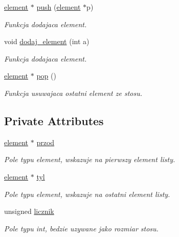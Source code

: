 \begin{DoxyCompactItemize}
\hyperlink{classelement}{element} $\ast$ \hyperlink{classstos__lista_ad38186a811405f247940c262073744f1}{push} (\hyperlink{classelement}{element} $\ast$p)
\begin{DoxyCompactList}\small\item\em Funkcja dodajaca element. \end{DoxyCompactList}\item 
void \hyperlink{classstos__lista_af461edd89f331e301d02460dc330b4e5}{dodaj\-\_\-element} (int a)
\begin{DoxyCompactList}\small\item\em Funkcja dodajaca element. \end{DoxyCompactList}\item 
\hyperlink{classelement}{element} $\ast$ \hyperlink{classstos__lista_af637e1d174c0f0005e0157b6dc35c41a}{pop} ()
\begin{DoxyCompactList}\small\item\em Funkcja usuwajaca ostatni element ze stosu. \end{DoxyCompactList}\end{DoxyCompactItemize}
\subsection*{Private Attributes}
\begin{DoxyCompactItemize}
\item 
\hyperlink{classelement}{element} $\ast$ \hyperlink{classstos__lista_ad9cd66242f8b8342bb3d8cb5852f58c5}{przod}
\begin{DoxyCompactList}\small\item\em Pole typu element, wskazuje na pierwszy element listy. \end{DoxyCompactList}\item 
\hyperlink{classelement}{element} $\ast$ \hyperlink{classstos__lista_af724a08b1601250dfc1a333430be9515}{tyl}
\begin{DoxyCompactList}\small\item\em Pole typu element, wskazuje na ostatni element listy. \end{DoxyCompactList}\item 
unsigned \hyperlink{classstos__lista_ab9d47f55d1288d44e0b58fcea281925f}{licznik}
\begin{DoxyCompactList}\small\item\em Pole typu int, bedzie uzywane jako rozmiar stosu. \end{DoxyCompactList}\end{DoxyCompactItemize}


